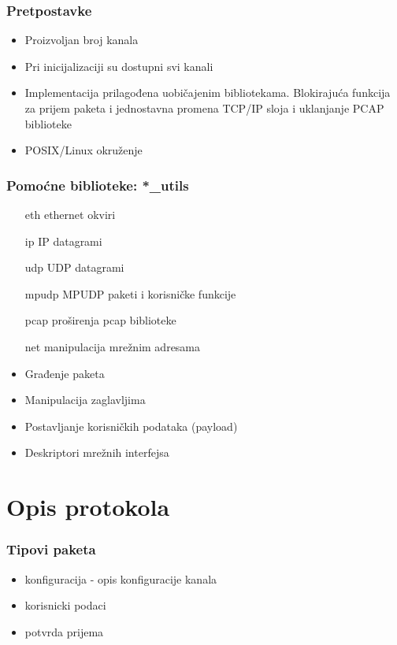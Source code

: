 \documentclass{beamer}
\begin{document}
    \begin{frame}
        \frametitle{Pretpostavke}

        \begin{itemize}
            \item{Proizvoljan broj kanala}
            \item{Pri inicijalizaciji su dostupni svi kanali}
            \item{Implementacija prilagođena uobičajenim bibliotekama.
                Blokirajuća funkcija za prijem paketa i jednostavna promena
                TCP/IP sloja i uklanjanje PCAP biblioteke}
            \item{POSIX/Linux okruženje}
        \end{itemize}
    \end{frame}
    \begin{frame}
        \frametitle{Pomoćne biblioteke:  *\_utils}
        \begin{itemize}
            \item[eth]{ethernet okviri}
            \item[ip]{IP datagrami}
            \item[udp]{UDP datagrami}
            \item[mpudp]{MPUDP paketi i korisničke funkcije}
            \item[pcap]{proširenja pcap biblioteke}
            \item[net]{manipulacija mrežnim adresama}
        \end{itemize}

        \begin{itemize}
            \item{Građenje paketa}
            \item{Manipulacija zaglavljima}
            \item{Postavljanje korisničkih podataka (payload)}
            \item{Deskriptori mrežnih interfejsa}
        \end{itemize}
    \end{frame}

\section{Opis protokola}
    \begin{frame}
        \frametitle{Tipovi paketa}

        \begin{itemize}
            \item{konfiguracija - opis konfiguracije kanala}
            \item{korisnicki podaci}
            \item{potvrda prijema}
        \end{itemize}
    \end{frame}
\end{document}
